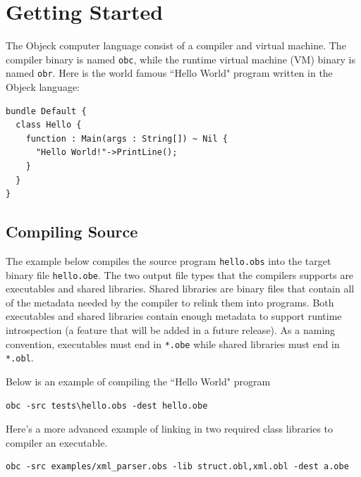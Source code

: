 \documentclass[12pt]{article}
\begin{document}
\section{Getting Started}

The Objeck computer language consist of a compiler and virtual
machine.  The compiler binary is named \texttt{obc}, while the runtime
virtual machine (VM) binary is named \texttt{obr}.  Here is the world
famous ``Hello World" program written in the Objeck language:

\begin{verbatim}
bundle Default {
  class Hello {
    function : Main(args : String[]) ~ Nil {
      "Hello World!"->PrintLine();
    }
  }
}
\end{verbatim}

\subsection{Compiling Source}
The example below compiles the source program \texttt{hello.obs} into
the target binary file \texttt{hello.obe}.  The two output file types
that the compilers supports are executables and shared libraries.
Shared libraries are binary files that contain all of the metadata
needed by the compiler to relink them into programs.  Both executables
and shared libraries contain enough metadata to support runtime
introspection (a feature that will be added in a future release).  As
a naming convention, executables must end in \texttt{*.obe} while
shared libraries must end in \texttt{*.obl}.

Below is an example of compiling the ``Hello World" program
\begin{verbatim}
obc -src tests\hello.obs -dest hello.obe
\end{verbatim}

Here's a more advanced example of linking in two required class
libraries to compiler an executable.
\begin{verbatim}
obc -src examples/xml_parser.obs -lib struct.obl,xml.obl -dest a.obe
\end{verbatim}
\end{document}
